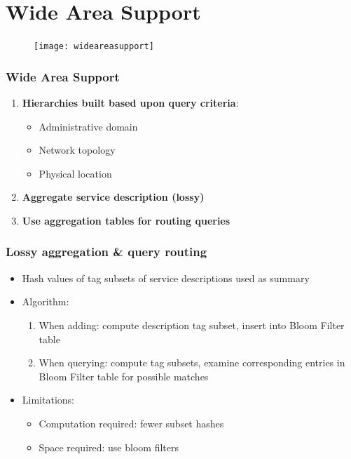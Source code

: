 \documentclass{beamer}
\begin{document}
\section{Wide Area Support}
\begin{frame}
\begin{figure}
\centering
\texttt{[image: wideareasupport]}
\end{figure}
\end{frame}
\begin{frame}
\frametitle{Wide Area Support}
\begin{enumerate}[<+->]
\item {\bf Hierarchies built based upon query criteria}: \\
\begin{itemize}
\item Administrative domain
\item Network topology
\item Physical location
\end{itemize}
\item {\bf Aggregate service description (lossy)}
\item {\bf Use aggregation tables for routing queries}
\end{enumerate}
\end{frame}
\begin{frame}
\frametitle{Lossy aggregation \& query routing}
\begin{itemize}
\item Hash values of tag subsets of service descriptions used as summary
\item Algorithm:
\begin{enumerate}
\item When adding: compute description tag subset, insert into Bloom Filter table
\item When querying: compute tag subsets, examine corresponding entries in Bloom Filter table for possible matches
\end{enumerate}
\item Limitations:
\begin{itemize}
\item Computation required: fewer subset hashes
\item Space required: use bloom filters
\end{itemize}
\end{itemize}
\end{frame}
\end{document}
